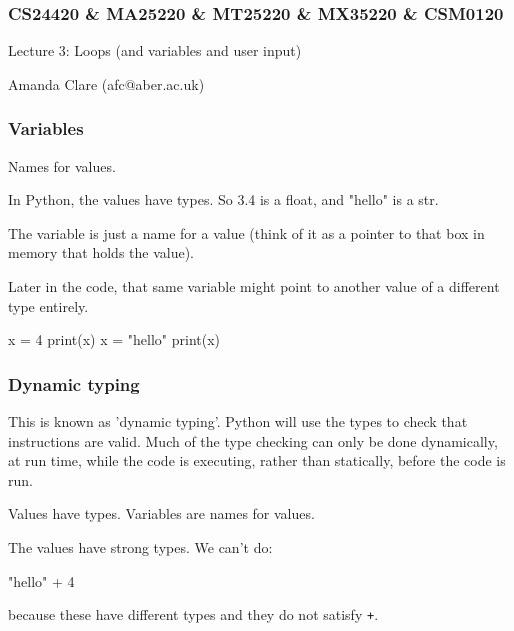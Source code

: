 \documentclass{beamer}
\begin{document}

\begin{frame}
\frametitle{CS24420 \& MA25220 \& MT25220 \& MX35220 \& CSM0120}

\begin{center}
\begin{huge}
Lecture 3: Loops (and variables and user input)
\end{huge}

\bigskip

Amanda Clare (afc@aber.ac.uk)

\end{center}
\end{frame}


\begin{frame}[fragile]
\frametitle{Variables}
Names for values. 

\bigskip

In Python, the values have types. So 3.4 is a float,
and "hello" is a str. 

\bigskip

The variable is just a name for a value (think
of it as a pointer to that box in memory that holds the value). 

\bigskip

Later in the code, that same variable might point to another value of
a different type entirely.

\begin{code}
x = 4
print(x)
x = "hello"
print(x)
\end{code}

\end{frame}



\begin{frame}[fragile]
\frametitle{Dynamic typing}
This is known as 'dynamic typing'. Python will use the types to check
that instructions are valid. Much of the type checking can only be done
dynamically, at
run time, while the code is executing, rather than statically, before
the code is run. 
 
\bigskip

Values have types. Variables are names for values.

\bigskip

The values have strong types. We can't do: 
\begin{code}
"hello" + 4

\end{code}

because these have different types and they do not satisfy \texttt{+}.
\end{frame}
\end{document}
